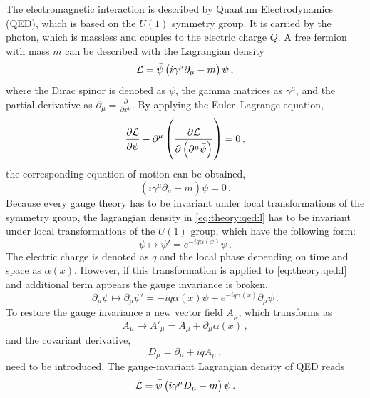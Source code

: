 The electromagnetic interaction is described by Quantum Electrodynamics (QED), which is based on the $U(1)$ symmetry group.
It is carried by the photon, which is massless and couples to the electric charge $Q$.
A free fermion with mass $m$ can be described with the Lagrangian density
\begin{equation}
    \label{eq:theory:qed:l}
    \mathcal{L} = \bar{\psi} \left( i \gamma^\mu \partial_\mu - m\right) \psi \,,
\end{equation}
where the Dirac spinor is denoted as $\psi$, the gamma matrices as $\gamma^\mu$, and the partial derivative as $\partial_\mu = \frac{\partial}{\partial x^\mu}$.
By applying the Euler--Lagrange equation,
\begin{equation}
    \frac{\partial \mathcal{L}}{\partial \bar{\psi}} - \partial^\mu \left( \frac{\partial \mathcal{L}}{\partial \left(\partial^\mu \bar{\psi} \right)} \right) = 0 \,,
\end{equation}
the corresponding equation of motion can be obtained,
\begin{equation}
     \left( i \gamma^\mu \partial_\mu - m\right) \psi = 0\,.
\end{equation}
Because every gauge theory has to be invariant under local transformations of the symmetry group, the lagrangian density in \cref{eq:theory:qed:l} has to be
invariant under local transformations of the $U(1)$ group, which have the following form:
\begin{equation}
    \psi \mapsto \psi' = e^{-iq\alpha(x)} \psi \,.
\end{equation}
The electric charge is denoted as $q$ and the local phase depending on time and space as $\alpha(x)$.
However, if this transformation is applied to \cref{eq:theory:qed:l} and additional term appears the
gauge invariance is broken,
\begin{equation}
    \partial_\mu \psi \mapsto \partial_\mu \psi' = -i q \alpha(x) \psi + e^{-iq\alpha(x)} \partial_\mu \psi \,.
\end{equation}
To restore the gauge invariance a new vector field $A_\mu$, which transforms as
\begin{equation}
    A_\mu \mapsto A'_\mu = A_\mu + \partial_\mu \alpha(x) \,,
\end{equation}
and the covariant derivative,
\begin{equation}
    D_\mu = \partial_\mu + i q A_\mu \,,
\end{equation}
need to be introduced.
The gauge-invariant Lagrangian density of QED reads
\begin{equation}
    \mathcal{L} = \bar{\psi} \left( i \gamma^\mu D_\mu -m \right) \psi \,.
\end{equation}
